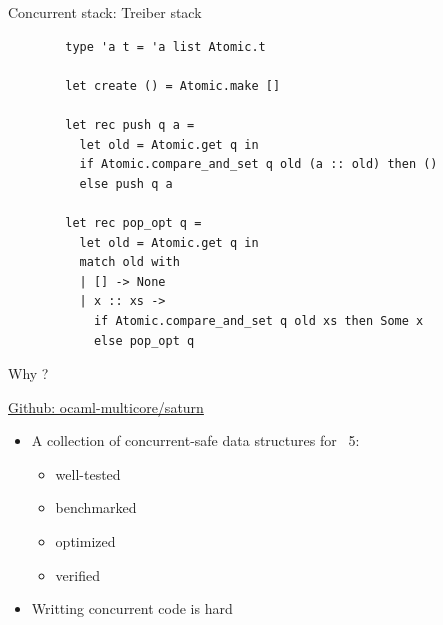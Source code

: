 \begin{frame}[fragile]{Concurrent stack: Treiber stack}     
    \begin{lstlisting}
        type 'a t = 'a list Atomic.t

        let create () = Atomic.make []
      
        let rec push q a =
          let old = Atomic.get q in
          if Atomic.compare_and_set q old (a :: old) then ()
          else push q a
      
        let rec pop_opt q =
          let old = Atomic.get q in
          match old with
          | [] -> None
          | x :: xs -> 
            if Atomic.compare_and_set q old xs then Some x 
            else pop_opt q
    \end{lstlisting}
\end{frame}

\begin{frame}{Why \Saturn ?}
    \hfill\small{\href{https://github.com/ocaml-multicore/saturn}{Github: ocaml-multicore/saturn}
\vfill
    \begin{itemize}[label=$\bullet$]
        \item A collection of concurrent-safe data structures for \OCaml~5: 
        \begin{itemize}[label=$\diamond$]
            \item well-tested
            \item benchmarked
            \item optimized
            \item verified
        \end{itemize}
        \item Writting concurrent code is hard 
    \end{itemize}
    }
    \vfill
\end{frame}


